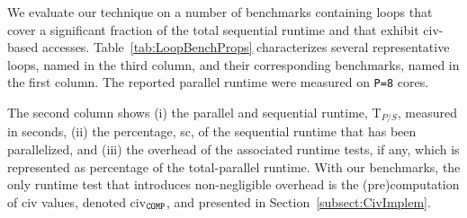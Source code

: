 \documentclass{sig-alternate}
\begin{document}
We evaluate our technique on a number of benchmarks containing loops that cover a significant
fraction of the total sequential runtime and that exhibit {\sc civ}-based accesses.
%
Table~\ref{tab:LoopBenchProps} characterizes several representative loops, named in 
the third column, and their corresponding benchmarks, named in the first column.
The reported parallel runtime were measured on {\tt P=8} cores.
%

The second column shows 
(i)   the parallel and sequential runtime, T$_{P/S}$, measured in seconds,
(ii)  the percentage, {\sc sc}, of the sequential runtime that has been parallelized, and 
(iii) the overhead of the associated runtime tests, if any, which is represented as percentage of
        the total-parallel runtime. With our benchmarks, the only runtime test that introduces
        non-negligible overhead is the (pre)computation of {\sc civ} values, 
        denoted {\sc civ}$_{\tt{}COMP}$, and presented in Section~\ref{subsect:CivImplem}.   


\end{document}
